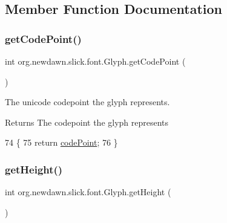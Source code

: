 \subsection{Member Function Documentation}
\mbox{\label{classorg_1_1newdawn_1_1slick_1_1font_1_1_glyph_a8950e9b59d7e7c08122bee9a4f1a0e29}} 
\subsubsection{\texorpdfstring{get\+Code\+Point()}{getCodePoint()}}
{\footnotesize\ttfamily int org.\+newdawn.\+slick.\+font.\+Glyph.\+get\+Code\+Point (\begin{DoxyParamCaption}{ }\end{DoxyParamCaption})\hspace{0.3cm}{\ttfamily [inline]}}

The unicode codepoint the glyph represents.

\begin{DoxyReturn}{Returns}
The codepoint the glyph represents 
\end{DoxyReturn}

\begin{DoxyCode}
74                                \{
75         \textcolor{keywordflow}{return} \mbox{\hyperlink{classorg_1_1newdawn_1_1slick_1_1font_1_1_glyph_a7aea2e2bd765045b2457d58e14052e37}{codePoint}};
76     \}
\end{DoxyCode}
\mbox{\label{classorg_1_1newdawn_1_1slick_1_1font_1_1_glyph_a192eaf09655bda1f72198dae3fac9710}} 
\subsubsection{\texorpdfstring{get\+Height()}{getHeight()}}
{\footnotesize\ttfamily int org.\+newdawn.\+slick.\+font.\+Glyph.\+get\+Height (\begin{DoxyParamCaption}{ }\end{DoxyParamCaption})\hspace{0.3cm}{\ttfamily [inline]}}

